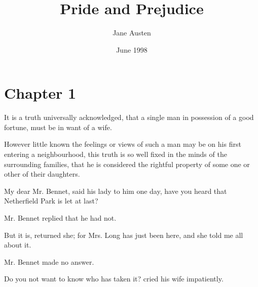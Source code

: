 \documentclass[twocolumn,DIV=7]{scrartcl}
\title{Pride and Prejudice}
\author{Jane Austen}
\date{June 1998}
\begin{document}
\maketitle





















\section{Chapter 1}


It is a truth universally acknowledged, that a single man in possession
of a good fortune, must be in want of a wife.

However little known the feelings or views of such a man may be on his
first entering a neighbourhood, this truth is so well fixed in the minds
of the surrounding families, that he is considered the rightful property
of some one or other of their daughters.

My dear Mr. Bennet, said his lady to him one day, have you heard that
Netherfield Park is let at last?

Mr. Bennet replied that he had not.

But it is, returned she; for Mrs. Long has just been here, and she
told me all about it.

Mr. Bennet made no answer.

Do you not want to know who has taken it? cried his wife impatiently.
\end{document}
